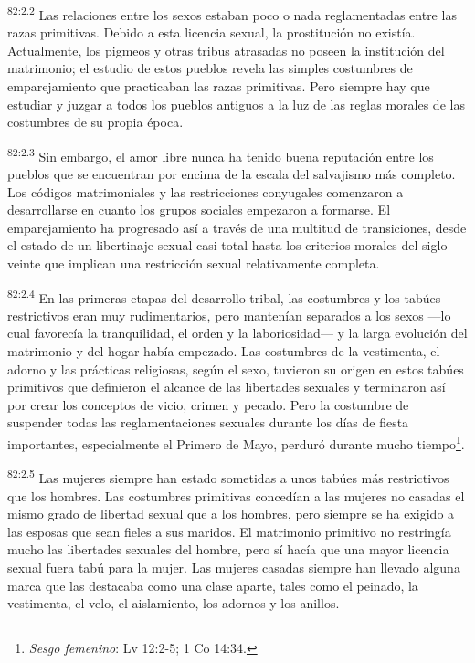 \par
\textsuperscript{82:2.2} Las relaciones entre los sexos estaban poco o nada reglamentadas entre las razas primitivas. Debido a esta licencia sexual, la prostitución no existía. Actualmente, los pigmeos y otras tribus atrasadas no poseen la institución del matrimonio; el estudio de estos pueblos revela las simples costumbres de emparejamiento que practicaban las razas primitivas. Pero siempre hay que estudiar y juzgar a todos los pueblos antiguos a la luz de las reglas morales de las costumbres de su propia época.

\par
\textsuperscript{82:2.3} Sin embargo, el amor libre nunca ha tenido buena reputación entre los pueblos que se encuentran por encima de la escala del salvajismo más completo. Los códigos matrimoniales y las restricciones conyugales comenzaron a desarrollarse en cuanto los grupos sociales empezaron a formarse. El emparejamiento ha progresado así a través de una multitud de transiciones, desde el estado de un libertinaje sexual casi total hasta los criterios morales del siglo veinte que implican una restricción sexual relativamente completa.

\par
\textsuperscript{82:2.4} En las primeras etapas del desarrollo tribal, las costumbres y los tabúes restrictivos eran muy rudimentarios, pero mantenían separados a los sexos ---lo cual favorecía la tranquilidad, el orden y la laboriosidad--- y la larga evolución del matrimonio y del hogar había empezado. Las costumbres de la vestimenta, el adorno y las prácticas religiosas, según el sexo, tuvieron su origen en estos tabúes primitivos que definieron el alcance de las libertades sexuales y terminaron así por crear los conceptos de vicio, crimen y pecado. Pero la costumbre de suspender todas las reglamentaciones sexuales durante los días de fiesta importantes, especialmente el Primero de Mayo, perduró durante mucho tiempo\footnote{\textit{Sesgo femenino}: Lv 12:2-5; 1 Co 14:34.}.

\par
\textsuperscript{82:2.5} Las mujeres siempre han estado sometidas a unos tabúes más restrictivos que los hombres. Las costumbres primitivas concedían a las mujeres no casadas el mismo grado de libertad sexual que a los hombres, pero siempre se ha exigido a las esposas que sean fieles a sus maridos. El matrimonio primitivo no restringía mucho las libertades sexuales del hombre, pero sí hacía que una mayor licencia sexual fuera tabú para la mujer. Las mujeres casadas siempre han llevado alguna marca que las destacaba como una clase aparte, tales como el peinado, la vestimenta, el velo, el aislamiento, los adornos y los anillos.

